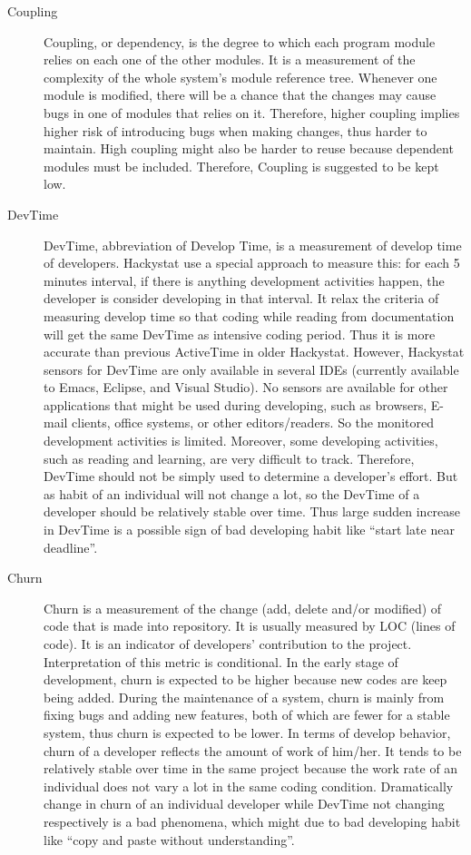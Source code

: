 \begin{description}
\item[Coupling] 
Coupling, or dependency, is the degree to which each program module relies on each one of the other modules\cite{wiki:coupling}. It is a measurement of the complexity of the whole system's module reference tree. Whenever one module is modified, there will be a chance that the changes may cause bugs in one of modules that relies on it. Therefore, higher coupling implies higher risk of introducing bugs when making changes, thus harder to maintain. High coupling might also be harder to reuse because dependent modules must be included. Therefore, Coupling is suggested to be kept low.

\item[DevTime] 
DevTime, abbreviation of Develop Time, is a measurement of develop time of developers. Hackystat use a special approach to measure this: for each 5 minutes interval, if there is anything development activities happen, the developer is consider developing in that interval. It relax the criteria of measuring develop time so that coding while reading from documentation will get the same DevTime as intensive coding period. Thus it is more accurate than previous ActiveTime in older Hackystat. However, Hackystat sensors for DevTime are only available in several IDEs (currently available to Emacs, Eclipse, and Visual Studio). No sensors are available for other applications that might be used during developing, such as browsers, E-mail clients, office systems, or other editors/readers. So the monitored development activities is limited. Moreover, some developing activities, such as reading and learning, are very difficult to track. Therefore, DevTime should not be simply used to determine a developer's effort. But as habit of an individual will not change a lot, so the DevTime of a developer should be relatively stable over time. Thus large sudden increase in DevTime is a possible sign of bad developing habit like ``start late near deadline''.

\item[Churn] 
Churn is a measurement of the change (add, delete and/or modified) of code that is made into repository. It is usually measured by LOC (lines of code). It is an indicator of developers' contribution to the project. Interpretation of this metric is conditional. In the early stage of development, churn is expected to be higher because new codes are keep being added. During the maintenance of a system, churn is mainly from fixing bugs and adding new features, both of which are fewer for a stable system, thus churn is expected to be lower. In terms of develop behavior, churn of a developer reflects the amount of work of him/her. It tends to be relatively stable over time in the same project because the work rate of an individual does not vary a lot in the same coding condition. Dramatically change in churn of an individual developer while DevTime not changing respectively is a bad phenomena, which might due to bad developing habit like ``copy and paste without understanding''.


\end{description}
